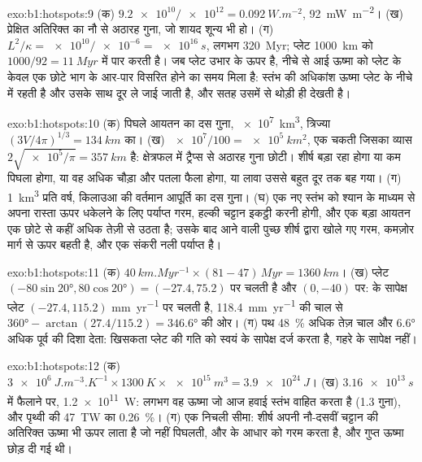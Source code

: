 \begin{solution}{exo:b1:hotspots:9}
(क) $\num{9.2e10}/\num{e12} = \qty{0.092}{W.m^{-2}}$, \qty{92}{mW.m^{-2}}। (ख) प्रेक्षित अतिरिक्त का नौ से अठारह गुना, जो शायद शून्य भी हो। (ग) $L^2/\kappa =
\num{e10}/\num{e-6} = \qty{e16}{s}$, लगभग \qty{320}{Myr}; प्लेट \qty{1000}{km} को $1000/92 = \qty{11}{Myr}$ में पार करती है। जब प्लेट उभार के ऊपर है, नीचे से आई ऊष्मा को प्लेट के केवल एक छोटे भाग के आर-पार विसरित होने का समय मिला है: स्तंभ की अधिकांश ऊष्मा प्लेट के नीचे  में रहती है और उसके साथ दूर ले जाई जाती है, और सतह उसमें से थोड़ी ही देखती है।
\end{solution}

\begin{solution}{exo:b1:hotspots:10}
(क) पिघले आयतन का दस गुना, \qty{e7}{km^3}, त्रिज्या $(3V/4\pi)^{1/3} = \qty{134}{km}$ का। (ख) $\num{e7}/100 = \qty{e5}{km^2}$, एक चकती जिसका व्यास $2\sqrt{\num{e5}/\pi} = \qty{357}{km}$ है: क्षेत्रफल में ट्रैप्स से अठारह गुना छोटी। शीर्ष बड़ा रहा होगा या कम पिघला होगा, या वह अधिक चौड़ा और पतला फैला होगा, या लावा उससे बहुत दूर तक बह गया। (ग) \qty{1}{km^3} प्रति वर्ष, किलाउआ की वर्तमान आपूर्ति का दस गुना। (घ) एक नए स्तंभ को श्यान  के माध्यम से अपना रास्ता ऊपर धकेलने के लिए पर्याप्त गरम, हल्की चट्टान इकट्ठी करनी होगी, और एक बड़ा आयतन एक छोटे से कहीं अधिक तेज़ी से उठता है; उसके बाद आने वाली पुच्छ शीर्ष द्वारा खोले गए गरम, कमज़ोर मार्ग से ऊपर बहती है, और एक संकरी नली पर्याप्त है।
\end{solution}

\begin{solution}{exo:b1:hotspots:11}
(क) $\qty{40}{km.Myr^{-1}}\times(81 - 47)\,\unit{Myr} = \qty{1360}{km}$।
(ख) प्लेट $(-80\sin\ang{20}, 80\cos\ang{20}) = (-27.4, 75.2)$ पर चलती है और  $(0, -40)$ पर:  के सापेक्ष प्लेट
$(-27.4, 115.2)$ \unit{mm.yr^{-1}} पर चलती है, \qty{118.4}{mm.yr^{-1}} की चाल से
$\ang{360} - \arctan(27.4/115.2) = \ang{346.6}$ की ओर। (ग) पथ \qty{48}{\percent} अधिक तेज़ चाल और \ang{6.6} अधिक पूर्व की दिशा देता: खिसकता  प्लेट की गति को स्वयं के सापेक्ष दर्ज करता है, गहरे  के सापेक्ष नहीं।
\end{solution}

\begin{solution}{exo:b1:hotspots:12}
(क) $\qty{3e6}{J.m^{-3}.K^{-1}}\times\qty{1300}{K}\times\qty{e15}{m^3} =
\qty{3.9e24}{J}$। (ख) $\qty{3.16e13}{s}$ में फैलाने पर, \qty{1.2e11}{W}: लगभग वह ऊष्मा जो आज हवाई स्तंभ वाहित करता है (1.3 गुना), और पृथ्वी की \qty{47}{TW} का \qty{0.26}{\percent}। (ग) एक निचली सीमा: शीर्ष अपनी नौ-दसवीं चट्टान की अतिरिक्त ऊष्मा भी ऊपर लाता है जो नहीं पिघलती, और  के आधार को गरम करता है, और गुप्त ऊष्मा छोड़ दी गई थी।
\end{solution}

